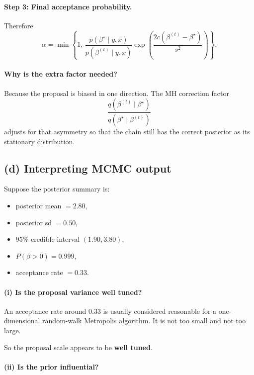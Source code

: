 \documentclass[11pt]{article}
\begin{document}
\paragraph{Step 3: Final acceptance probability.}

Therefore
\[
\boxed{
\alpha
=
\min\left\{
1,\,
\frac{p(\beta^\star\mid y,x)}{p(\beta^{(t)}\mid y,x)}
\exp\left(
\frac{2c(\beta^{(t)}-\beta^\star)}{s^2}
\right)
\right\}.
}
\]

\paragraph{Why is the extra factor needed?}

Because the proposal is biased in one direction.
The MH correction factor
\[
\frac{q(\beta^{(t)}\mid \beta^\star)}{q(\beta^\star\mid \beta^{(t)})}
\]
adjusts for that asymmetry so that the chain still has the correct posterior as its stationary distribution.

\subsection*{(d) Interpreting MCMC output}

Suppose the posterior summary is:
\begin{itemize}[leftmargin=1.5em]
    \item posterior mean $=2.80$,
    \item posterior sd $=0.50$,
    \item 95\% credible interval $(1.90,3.80)$,
    \item $P(\beta>0)=0.999$,
    \item acceptance rate $=0.33$.
\end{itemize}

\paragraph{(i) Is the proposal variance well tuned?}

An acceptance rate around $0.33$ is usually considered reasonable for a one-dimensional random-walk Metropolis algorithm.
It is not too small and not too large.

So the proposal scale appears to be \textbf{well tuned}.

\paragraph{(ii) Is the prior influential?}
\end{document}
